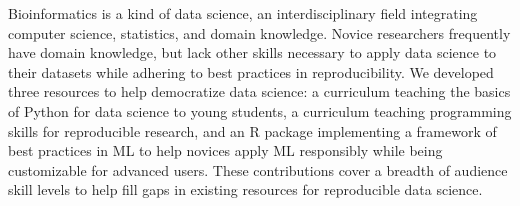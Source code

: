 Bioinformatics is a kind of data science, an interdisciplinary field integrating
computer science, statistics, and domain knowledge.
Novice researchers frequently have domain knowledge, but lack other skills
necessary to apply data science to their datasets while adhering to best
practices in reproducibility.
We developed three resources to help democratize data science:
a curriculum teaching the basics of Python for data science to young students,
a curriculum teaching programming skills for reproducible research,
and an R package implementing a framework of best practices in ML to help
novices apply ML responsibly while being customizable for advanced users.
These contributions cover a breadth of audience skill levels to help fill
gaps in existing resources for reproducible data science.
